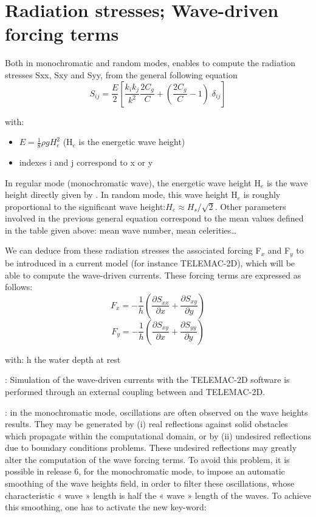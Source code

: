 \section{Radiation stresses; Wave-driven forcing terms}

Both in monochromatic and random modes, \artemis{} enables to compute the
radiation stresses Sxx, Sxy and Syy, from the general following
equation~\cite{Dingemans1987}
\[S_{ij} =\frac{E}{2} \left[\frac{k_{i} k_{j} }{k^{2} } \frac{2C_{g} }{C} +\left(\frac{2C_{g} }{C} -1\right)\; \delta _{ij} \right]\]

 with:

\begin{itemize}
\item  $E=\frac{1}{8} \rho gH_{e}^{2} $  (H${}_{e}$ is the energetic wave height)

\item  indexes i and j correspond to x or y
\end{itemize}

In regular mode (monochromatic wave), the energetic wave height
H${}_{e}$ is the wave height directly given by \artemis{}. In random mode,
this wave height H${}_{e}$ is roughly proportional to the
significant wave height:$H_{e} \approx H_{s} /\sqrt{2} $. Other parameters
involved in the previous general equation correspond to the mean values defined
in the table given above: mean wave number, mean celerities\ldots

We can deduce from these radiation stresses the associated forcing F${}_{x}$ and F${}_{y}$ to be introduced in a current model (for instance TELEMAC-2D), which will be able to compute the wave-driven currents. These forcing terms are expressed as follows:
\[F_{x} =-\frac{1}{h} \left(\frac{\partial S_{xx} }{\partial x} +\frac{\partial S_{xy} }{\partial y} \right)\]
\[F_{y} =-\frac{1}{h} \left(\frac{\partial S_{xy} }{\partial x} +\frac{\partial S_{yy} }{\partial y} \right)\]

  with: h the water depth at rest

: Simulation of the wave-driven currents with the TELEMAC-2D software is performed through an external coupling between \artemis{} and TELEMAC-2D.

: in the monochromatic mode, oscillations are often observed on the wave heights results. They may be generated by (i) real reflections against solid obstacles which propagate within the computational domain, or by (ii) undesired reflections due to boundary conditions problems. These undesired reflections may greatly alter the computation of the wave forcing terms. To avoid this problem, it is possible in release 6, for the monochromatic mode, to impose an automatic smoothing of the wave heights field, in order to filter these oscillations, whose characteristic « wave » length is half the « wave » length of the waves. To achieve this smoothing, one has to activate the new key-word:

